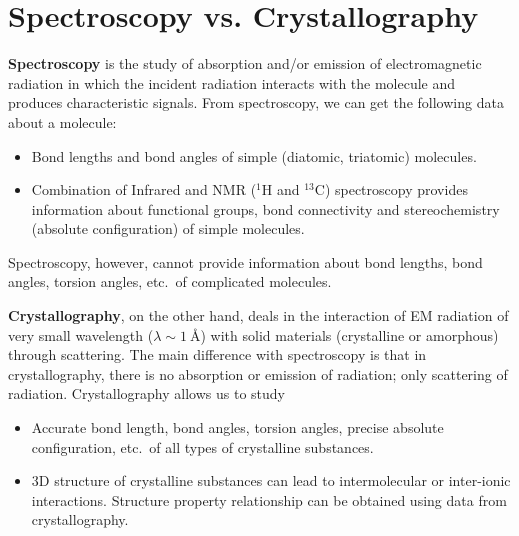 \section{Spectroscopy vs. Crystallography}
	
\textbf{Spectroscopy} is the study of absorption and/or emission of electromagnetic radiation in which the incident radiation interacts with the molecule and produces characteristic signals. From spectroscopy, we can get the following data about a molecule:%
%			
\begin{itemize}%
%		
    \item Bond lengths and bond angles of simple (diatomic, triatomic) molecules.
    
    \item Combination of Infrared and NMR (${}^1 \mathrm{H}$ and ${}^{13} \mathrm{C}$) spectroscopy provides information about functional groups, bond connectivity and stereochemistry (absolute configuration) of simple molecules.
    
    \end{itemize}
    
Spectroscopy, however, cannot provide information about bond lengths, bond angles, torsion angles, etc.\ of complicated molecules.

\textbf{Crystallography}, on the other hand, deals in the interaction of EM radiation of very small wavelength ($\lambda \sim \SI{1}{\angstrom}$) with solid materials (crystalline or amorphous) through scattering. The main difference with spectroscopy is that in crystallography, there is no absorption or emission of radiation; only scattering of radiation. Crystallography allows us to study%
%			
\begin{itemize}%
%			
    \item Accurate bond length, bond angles, torsion angles, precise absolute configuration, etc.\ of all types of crystalline substances.
    
    \item 3D structure of crystalline substances can lead to intermolecular or inter-ionic interactions. Structure property relationship can be obtained using data from crystallography.
    
\end{itemize}